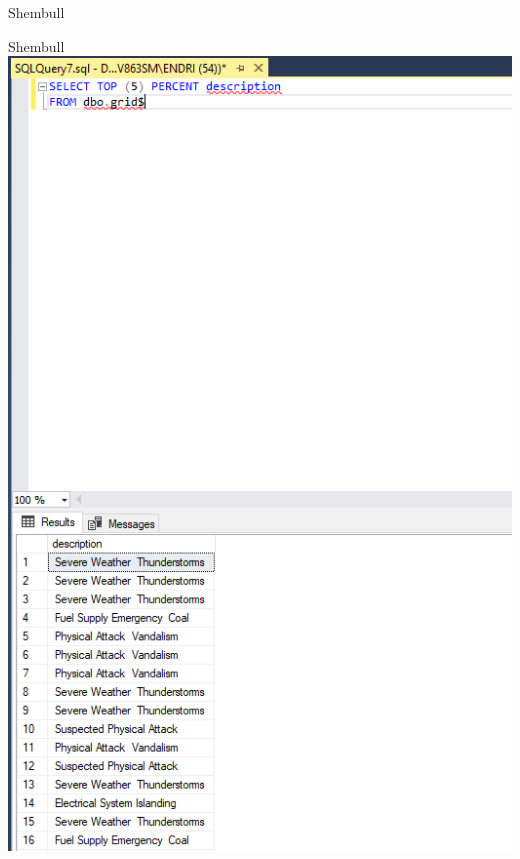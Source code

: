 \documentclass[
  ignorenonframetext,
]{beamer}
\newenvironment{Shaded}{\begin{snugshade}}{\end{snugshade}}
\newcommand{\DecValTok}[1]{\textcolor[rgb]{0.00,0.00,0.81}{#1}}
\newcommand{\KeywordTok}[1]{\textcolor[rgb]{0.13,0.29,0.53}{\textbf{#1}}}
\newcommand{\NormalTok}[1]{#1}
\begin{document}
\begin{frame}[fragile]{Shembull}
\label{shembull-2}
\begin{Shaded}
\end{Shaded}
\end{frame}

\begin{frame}{Shembull}
\label{shembull-3}
\includegraphics{./Figs/query2.png}
\end{frame}
\end{document}
